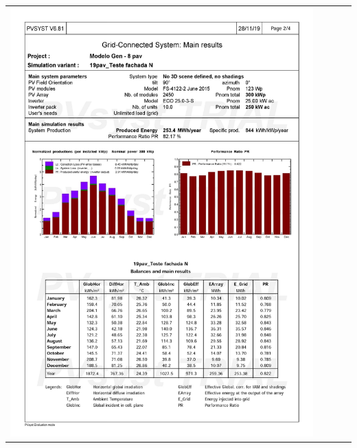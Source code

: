 \begin{table}[H]
    \centering
    \begin{tabular}{l}
        \includegraphics[width=0.9\textwidth]{figures/attachments/resultpv26.jpg}
    \end{tabular}
\end{table}
\pagebreak
